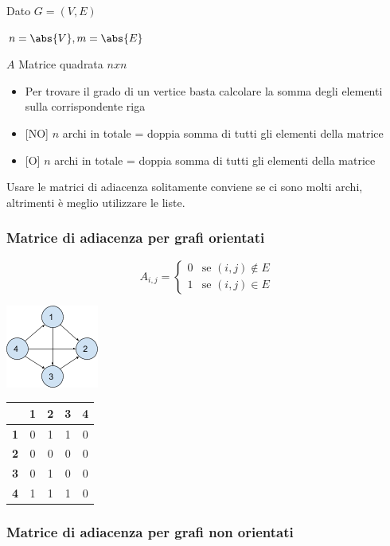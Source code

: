 \documentclass[11pt,a4paper,twoside,openright]{book}
\providecommand{\tightlist}{\setlength{\itemsep}{0pt}\setlength{\parskip}{0pt}}
\begin{document}
{Dato $G=(V,E)$}

$n=\abs{V},m=\abs{E}$

{$A$ Matrice quadrata $n x n$ }

\begin{itemize}
\tightlist
\item
  {Per trovare il grado di un vertice basta calcolare la somma degli elementi sulla corrispondente riga}
\item
  {{[}NO{]} $n$ archi in totale = doppia somma di tutti gli elementi della matrice}
\item
  {{[}O{]} $n$ archi in totale = doppia somma di tutti gli elementi della matrice}
\end{itemize}

{Usare le matrici di adiacenza solitamente conviene se ci sono molti archi, altrimenti è meglio utilizzare le liste.}

\subsubsection{Matrice di adiacenza per grafi orientati}

\begin{equation}
A_{i,j} = 
\begin{cases}
0 & \mbox{se } (i,j) \notin E \\ 
1 & \mbox{se } (i,j) \in E
\end{cases}
\end{equation}

{\includegraphics{images/image529.png}}

\begin{tabular}{|c|c|c|c|c|}
\hline 
  & \textbf{1} & \textbf{2} & \textbf{3} & \textbf{4} \\ 
\hline 
\textbf{1} & 0 & 1 & 1 & 0 \\ 
\hline 
\textbf{2} & 0 & 0 & 0 & 0 \\ 
\hline 
\textbf{3} & 0 & 1 & 0 & 0 \\ 
\hline 
\textbf{4} & 1 & 1 & 1 & 0 \\ 
\hline 
\end{tabular} 

\subsubsection{Matrice di adiacenza per grafi non orientati}
\end{document}
